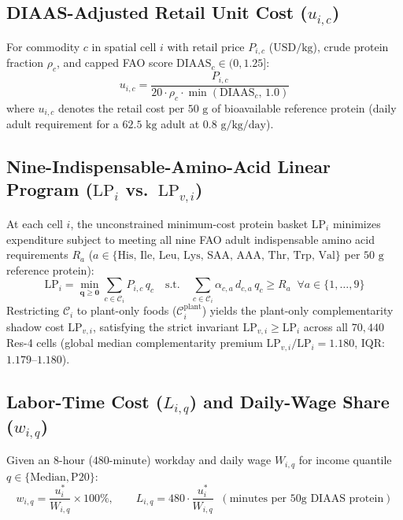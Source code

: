 \documentclass[11pt,a4paper]{article}
\begin{document}
\subsection{DIAAS-Adjusted Retail Unit Cost ($u_{i,c}$)}
For commodity $c$ in spatial cell $i$ with retail price $P_{i,c}$ ($\text{USD/kg}$), crude protein fraction $\rho_c$, and capped FAO score $\text{DIAAS}_c \in (0, 1.25]$:
\begin{equation}
u_{i,c} = \frac{P_{i,c}}{20 \cdot \rho_c \cdot \min(\text{DIAAS}_c,\, 1.0)}
\end{equation}
where $u_{i,c}$ denotes the retail cost per $50\text{ g}$ of bioavailable reference protein (daily adult requirement for a $62.5\text{ kg}$ adult at $0.8\text{ g/kg/day}$).

\subsection{Nine-Indispensable-Amino-Acid Linear Program ($\text{LP}_i$ vs.\ $\text{LP}_{v,i}$)}
At each cell $i$, the unconstrained minimum-cost protein basket $\text{LP}_i$ minimizes expenditure subject to meeting all nine FAO adult indispensable amino acid requirements $R_a$ ($a \in \{\text{His, Ile, Leu, Lys, SAA, AAA, Thr, Trp, Val}\}$ per $50\text{ g}$ reference protein):
\begin{equation}
\text{LP}_i = \min_{\mathbf{q} \ge \mathbf{0}} \sum_{c \in \mathcal{C}_i} P_{i,c}\, q_c \quad \text{s.t.} \quad \sum_{c \in \mathcal{C}_i} \alpha_{c,a}\, d_{c,a}\, q_c \ge R_a \;\;\forall a \in \{1,\dots,9\}
\end{equation}
Restricting $\mathcal{C}_i$ to plant-only foods ($\mathcal{C}_i^{\text{plant}}$) yields the plant-only complementarity shadow cost $\text{LP}_{v,i}$, satisfying the strict invariant $\text{LP}_{v,i} \ge \text{LP}_i$ across all $70{,}440$ Res-4 cells (global median complementarity premium $\text{LP}_{v,i}/\text{LP}_i = 1.180$, IQR: $1.179\text{--}1.180$).

\subsection{Labor-Time Cost ($L_{i,q}$) and Daily-Wage Share ($w_{i,q}$)}
Given an $8\text{-hour}$ ($480\text{-minute}$) workday and daily wage $W_{i,q}$ for income quantile $q \in \{\text{Median}, \text{P20}\}$:
\begin{equation}
w_{i,q} = \frac{u_i^*}{W_{i,q}} \times 100\%, \qquad L_{i,q} = 480 \cdot \frac{u_i^*}{W_{i,q}} \;\; (\text{minutes per 50g DIAAS protein})
\end{equation}
\end{document}
